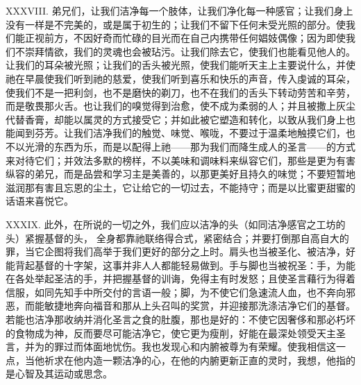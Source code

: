 XXXVIII. 弟兄们，让我们洁净每一个肢体，让我们净化每一种感官；让我们身上没有一样是不完美的，或是属于初生的；让我们不留下任何未受光照的部分。使我们能正视前方，不因好奇而忙碌的目光而在自己内携带任何娼妓偶像；因为即使我们不崇拜情欲，我们的灵魂也会被玷污。让我们除去它，使我们也能看见他人的。让我们的耳朵被光照；让我们的舌头被光照，使我们能听天主上主要说什么，并使祂在早晨使我们听到祂的慈爱，使我们听到喜乐和快乐的声音，传入虔诚的耳朵，使我们不是一把利剑，也不是磨快的剃刀，也不在我们的舌头下转动劳苦和辛劳，而是敬畏那火舌。也让我们的嗅觉得到治愈，使不成为柔弱的人；并且被撒上灰尘代替香膏，却能以属灵的方式接受它；并如此被它塑造和转化，以致从我们身上也能闻到芬芳。让我们洁净我们的触觉、味觉、喉咙，不要过于温柔地触摸它们，也不以光滑的东西为乐，而是以配得上祂——那为我们而降生成人的圣言——的方式来对待它们；并效法多默的榜样，不以美味和调味料来纵容它们，那些是更为有害纵容的弟兄，而是品尝和学习主是美善的，以那更美好且持久的味觉；不要短暂地滋润那有害且忘恩的尘土，它让给它的一切过去，不能持守；而是以比蜜更甜蜜的话语来喜悦它。\par

XXXIX. 此外，在所说的一切之外，我们应以洁净的头（如同洁净感官之工坊的头）紧握基督的头， 全身都靠祂联络得合式，紧密结合；并要打倒那自高自大的罪，当它企图将我们高举于我们更好的部分之上时。肩头也当被圣化、被洁净，好能背起基督的十字架，这事并非人人都能轻易做到。手与脚也当被祝圣：手，为能在各处举起圣洁的手，并把握基督的训诲，免得主有时发怒；且使圣言藉行为得着信服，如同先知手中所交付的言语一般；脚，为不使它们急速流人血，也不奔向邪恶，而能敏捷地奔向福音和那从上头召叫的奖赏，并迎接那洗涤洁净它们的基督。若能也洁净那收纳并消化圣言之食的肚腹，那也是好的：不使它因奢侈和那必朽坏的食物成为神，反而要尽可能洁净它，使它更为瘦削，好能在最深处领受天主圣言，并为的罪过而体面地忧伤。我也发现心和内腑被尊为有荣耀。使我相信这一点，当他祈求在他内造一颗洁净的心，在他的内腑更新正直的灵时，我想，他指的是心智及其运动或思念。\par

